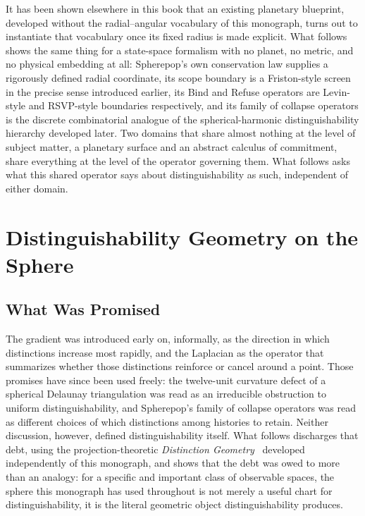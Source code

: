 \documentclass[11pt,fleqn]{book}
\numberwithin{equation}{chapter}
\theoremstyle{plain}
\theoremstyle{definition}
\theoremstyle{remark}
\begin{document}
It has been shown elsewhere in this book that an existing planetary blueprint, developed without the radial--angular vocabulary of this monograph, turns out to instantiate that vocabulary once its fixed radius is made explicit. What follows shows the same thing for a state-space formalism with no planet, no metric, and no physical embedding at all: Spherepop's own conservation law supplies a rigorously defined radial coordinate, its scope boundary is a Friston-style screen in the precise sense introduced earlier, its Bind and Refuse operators are Levin-style and RSVP-style boundaries respectively, and its family of collapse operators is the discrete combinatorial analogue of the spherical-harmonic distinguishability hierarchy developed later. Two domains that share almost nothing at the level of subject matter, a planetary surface and an abstract calculus of commitment, share everything at the level of the operator governing them. What follows asks what this shared operator says about distinguishability as such, independent of either domain.



\chapter{Distinguishability Geometry on the Sphere}

\section{What Was Promised}

The gradient was introduced early on, informally, as the direction in which distinctions increase most rapidly, and the Laplacian as the operator that summarizes whether those distinctions reinforce or cancel around a point. Those promises have since been used freely: the twelve-unit curvature defect of a spherical Delaunay triangulation was read as an irreducible obstruction to uniform distinguishability, and Spherepop's family of collapse operators was read as different choices of which distinctions among histories to retain. Neither discussion, however, defined distinguishability itself. What follows discharges that debt, using the projection-theoretic \emph{Distinction Geometry}~\cite{distinction-geometry} developed independently of this monograph, and shows that the debt was owed to more than an analogy: for a specific and important class of observable spaces, the sphere this monograph has used throughout is not merely a useful chart for distinguishability, it is the literal geometric object distinguishability produces.
\end{document}
